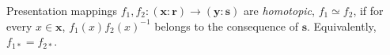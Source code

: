 Presentation mappings $f_1, f_2: (\mathbf{x} : \mathbf{r}) \to (\mathbf{y} : \mathbf{s})$ are \textit{homotopic}, $f_1 \simeq f_2$, if for every $x \in \mathbf{x}$, $f_1(x) f_2(x)^{-1}$ belongs to the consequence of $\mathbf{s}$. Equivalently, $f_{1*} = f_{2*}$.
